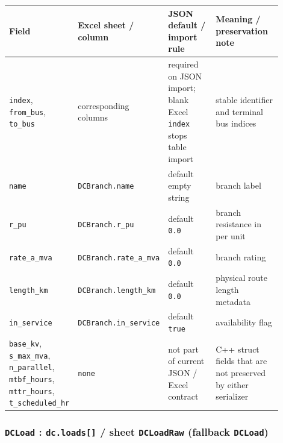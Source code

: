 \begin{longtable}{L{0.20\linewidth}L{0.24\linewidth}L{0.20\linewidth}L{0.26\linewidth}}
\toprule
Field & Excel sheet / column & JSON default / import rule & Meaning / preservation note \\
\midrule
\endhead
\texttt{index}, \texttt{from\_bus}, \texttt{to\_bus} & corresponding columns & required on JSON import; blank Excel \texttt{index} stops table import & stable identifier and terminal bus indices \\
\texttt{name} & \texttt{DCBranch.name} & default empty string & branch label \\
\texttt{r\_pu} & \texttt{DCBranch.r\_pu} & default \texttt{0.0} & branch resistance in per unit \\
\texttt{rate\_a\_mva} & \texttt{DCBranch.rate\_a\_mva} & default \texttt{0.0} & branch rating \\
\texttt{length\_km} & \texttt{DCBranch.length\_km} & default \texttt{0.0} & physical route length metadata \\
\texttt{in\_service} & \texttt{DCBranch.in\_service} & default \texttt{true} & availability flag \\
\texttt{base\_kv}, \texttt{s\_max\_mva}, \texttt{n\_parallel}, \texttt{mtbf\_hours}, \texttt{mttr\_hours}, \texttt{t\_scheduled\_hr} & \texttt{none} & not part of current JSON / Excel contract & C++ struct fields that are not preserved by either serializer \\
\bottomrule
\end{longtable}

\subsubsection*{\texttt{DCLoad} : \texttt{dc.loads[]} / sheet \texttt{DCLoadRaw} (fallback \texttt{DCLoad})}

